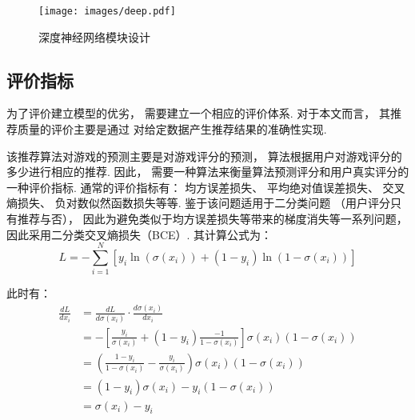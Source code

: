 \begin{figure}[!htbp]
  \centering
  \texttt{[image: images/deep.pdf]}
  \caption{深度神经网络模块设计}\label{fig:deep}
\end{figure}

\subsection{评价指标}

为了评价建立模型的优劣，
需要建立一个相应的评价体系.
对于本文而言，
其推荐质量的评价主要是通过
对给定数据产生推荐结果的准确性实现.

该推荐算法对游戏的预测主要是对游戏评分的预测，
算法根据用户对游戏评分的多少进行相应的推荐.
因此，
需要一种算法来衡量算法预测评分和用户真实评分的
一种评价指标.
通常的评价指标有：
均方误差损失、
平均绝对值误差损失、
交叉熵损失、
负对数似然函数损失等等.
鉴于该问题适用于二分类问题
（用户评分只有推荐与否），
因此为避免类似于均方误差损失等带来的梯度消失等一系列问题，
因此采用二分类交叉熵损失（BCE）.
其计算公式为：
\begin{equation}
  L=-\sum_{i=1}^{N}\left[y_{i} \ln \left(\sigma\left(x_{i}\right)\right)+\left(1-y_{i}\right) \ln \left(1-\sigma\left(x_{i}\right)\right)\right]
\end{equation}

此时有：
\begin{equation}
  \begin{aligned}
    \frac{d L}{d x_{i}} & =\frac{d L}{d \sigma\left(x_{i}\right)} \cdot \frac{d \sigma\left(x_{i}\right)}{d x_{i}}                                                                                         \\
                        & =-\left[\frac{y_{i}}{\sigma\left(x_{i}\right)}+\left(1-y_{i}\right) \frac{-1}{1-\sigma\left(x_{i}\right)}\right] \sigma\left(x_{i}\right)\left(1-\sigma\left(x_{i}\right)\right) \\
                        & =\left(\frac{1-y_{i}}{1-\sigma\left(x_{i}\right)}-\frac{y_{i}}{\sigma\left(x_{i}\right)}\right) \sigma\left(x_{i}\right)\left(1-\sigma\left(x_{i}\right)\right)                  \\
                        & =\left(1-y_{i}\right) \sigma\left(x_{i}\right)-y_{i}\left(1-\sigma\left(x_{i}\right)\right)                                                                                      \\
                        & =\sigma\left(x_{i}\right)-y_{i}
  \end{aligned}
\end{equation}

